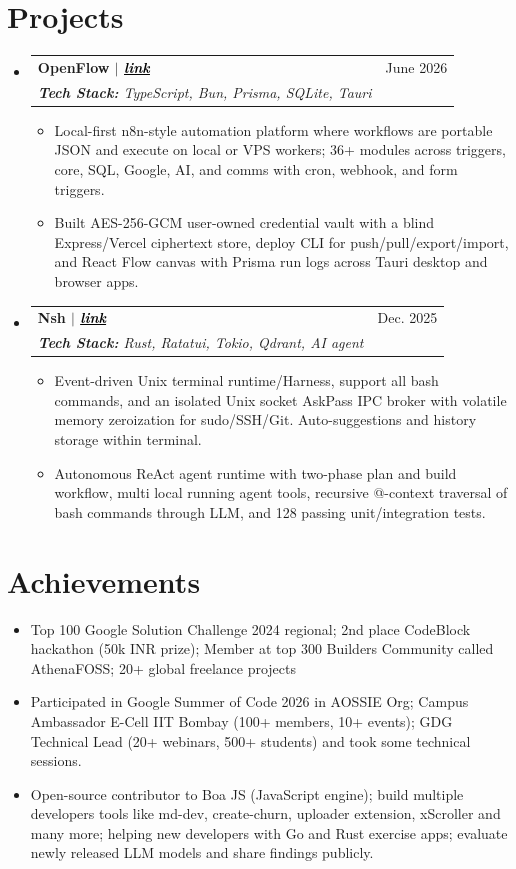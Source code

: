 \documentclass[letterpaper,11pt]{article}
\makeatletter
\newcommand{\resumeItem}[1]{
  \item\small{{#1}}
}
\newcommand{\resumeSubheading}[4]{
  \item
    \begin{tabular*}{0.97\textwidth}[t]{l@{\extracolsep{\fill}}r}
      \textbf{#1} & #2 \\
      \textit{\small#3} & \textit{\small #4} \\
    \end{tabular*}
}
\newcommand{\resumeSubHeadingListStart}{\begin{itemize}[leftmargin=0.15in, label={}, topsep=1pt, itemsep=2pt, parsep=0pt]}
\newcommand{\resumeSubHeadingListEnd}{\end{itemize}}
\newcommand{\resumeItemListStart}{\begin{itemize}[leftmargin=0.15in, topsep=1pt, itemsep=1pt, parsep=0pt]}
\newcommand{\resumeItemListEnd}{\end{itemize}}
\makeatother
\begin{document}
\section{Projects}
    \resumeSubHeadingListStart

    \resumeSubheading
      {OpenFlow $|$ \href{https://github.com/basharkhan7776/Openflow}{\textcolor{black}{\textit{\ul{link}}}}}{June 2026}
      {\textbf{Tech Stack:} TypeScript, Bun, Prisma, SQLite, Tauri}{}
      \resumeItemListStart
        \resumeItem{Local-first n8n-style automation platform where workflows are portable JSON and execute on local or VPS workers; 36+ modules across triggers, core, SQL, Google, AI, and comms with cron, webhook, and form triggers.}
        \resumeItem{Built AES-256-GCM user-owned credential vault with a blind Express/Vercel ciphertext store, deploy CLI for push/pull/export/import, and React Flow canvas with Prisma run logs across Tauri desktop and browser apps.}
      \resumeItemListEnd

      \resumeSubheading
        {Nsh $|$ \href{https://github.com/Basharkhan7776/nsh}{\textcolor{black}{\textit{\ul{link}}}}}{Dec. 2025}
        {\textbf{Tech Stack:} Rust, Ratatui, Tokio, Qdrant, AI agent}{}
        \resumeItemListStart
          \resumeItem{Event-driven Unix terminal runtime/Harness, support all bash commands, and an isolated Unix socket AskPass IPC broker with volatile memory zeroization for sudo/SSH/Git. Auto-suggestions and history storage within terminal.}
          \resumeItem{Autonomous ReAct agent runtime with two-phase plan and build workflow, multi local running agent tools, recursive @-context traversal of bash commands through LLM, and 128 passing unit/integration tests.}
        \resumeItemListEnd


    \resumeSubHeadingListEnd

\section{Achievements}
  \resumeItemListStart
    \resumeItem{Top 100 Google Solution Challenge 2024 regional; 2nd place CodeBlock hackathon (50k INR prize); Member at top 300 Builders Community called AthenaFOSS; 20+ global freelance projects}
    \resumeItem{Participated in Google Summer of Code 2026 in AOSSIE Org; Campus Ambassador E-Cell IIT Bombay (100+ members, 10+ events); GDG Technical Lead (20+ webinars, 500+ students) and took some technical sessions.}
    \resumeItem{Open-source contributor to Boa JS (JavaScript engine); build multiple developers tools like md-dev, create-churn, uploader extension, xScroller and many more; helping new developers with Go and Rust exercise apps; evaluate newly released LLM models and share findings publicly.}
  \resumeItemListEnd
\end{document}
